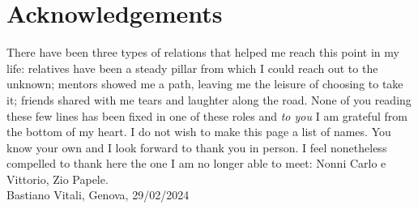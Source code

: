 \thispagestyle{plain}			%
\section*{Acknowledgements}
There have been three types of relations that helped me reach this point in my life: relatives have been a steady pillar from which I could reach out to the unknown; mentors showed me a path, leaving me the leisure of choosing to take it; friends shared with me tears and laughter along the road.
None of you reading these few lines has been fixed in one of these roles and \textit{to you} I am grateful from the bottom of my heart.
I do not wish to make this page a list of names. You know your own and I look forward to thank you in person.  I feel nonetheless compelled to thank here the one I am no longer able to meet: Nonni Carlo e Vittorio, Zio Papele.\\
\vspace{1.5cm}
\hfill
Bastiano Vitali, Genova, 29/02/2024

\newpage				%
\thispagestyle{empty}
\mbox{}